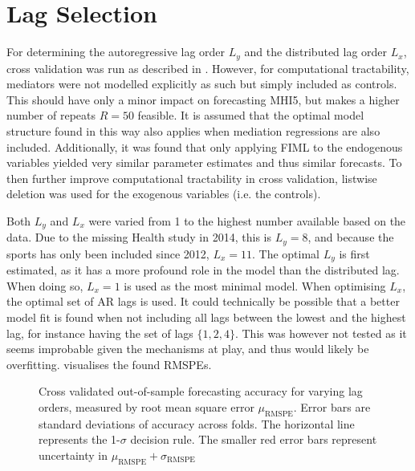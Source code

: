 \section{Lag Selection}
\label{sec:modelling:lags}
For determining the autoregressive lag order $L_y$ and the distributed lag order $L_x$, cross validation was run as
described in .
However, for computational tractability, mediators were not modelled explicitly as such but simply included as controls.
This should have only a minor impact on forecasting MHI5, but makes a higher number of repeats $R = 50$ feasible.
It is assumed that the optimal model structure found in this way also applies when mediation regressions are also
included.
Additionally, it was found that only applying FIML to the endogenous variables yielded very similar parameter estimates
and thus similar forecasts. To then further improve computational tractability in cross validation, listwise deletion
was used for the exogenous variables (i.e. the controls).

Both $L_y$ and $L_x$ were varied from 1 to the highest number available based on the data.
Due to the missing Health study in 2014, this is $L_y = 8$, and because the sports has only been included since 2012,
$L_x = 11$.
The optimal $L_y$ is first estimated, as it has a more profound role in the model than the distributed lag.
When doing so, $L_x = 1$ is used as the most minimal model. When optimising $L_x$, the optimal set of AR lags is used.
It could technically be possible that a better model fit is found when not including all lags between the lowest
and the highest lag, for instance having the set of lags $\{1, 2, 4\}$. This was however not tested as it seems improbable
given the mechanisms at play, and thus would likely be overfitting.
 visualises the found RMSPEs.

\begin{figure}[htbp]
    \centering
    \begin{subfigure}[t]{0.49\textwidth}
        \centering
        
        \vspace{0.1em}
    \end{subfigure}
    \hfill
    \begin{subfigure}[t]{0.49\textwidth}
        \centering
        
        \vspace{0.1em}
    \end{subfigure}
    \caption{Cross validated out-of-sample forecasting accuracy for varying lag orders, measured by root mean square error
    $\mu_{\text{RMSPE}}$.
    Error bars are standard deviations of accuracy across folds. The horizontal line represents the 1-$\sigma$ decision rule.
    The smaller red error bars represent uncertainty in $\mu_{\text{RMSPE}} + \sigma_{\text{RMSPE}}$}
    \label{fig:modelling:cv_lags}
\end{figure}

